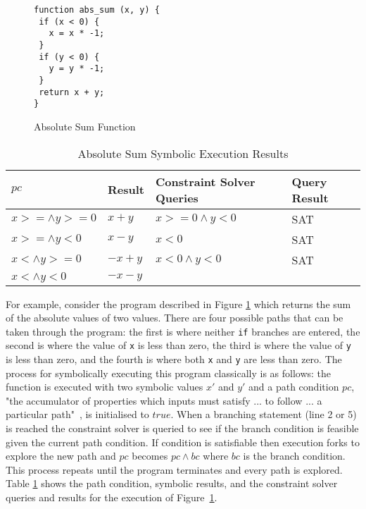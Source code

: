 \documentclass[]{final_report}
\begin{document}
\begin{figure}[t]
\begin{lstlisting}
function abs_sum (x, y) {
 if (x < 0) {
   x = x * -1;
 }
 if (y < 0) {
   y = y * -1;
 }
 return x + y;
}
\end{lstlisting}
\caption{\label{fig:abs-sum} Absolute Sum Function}
\end{figure} 

\begin{table}[t]
\centering
\begin{tabular}{|l|l|l|l|}
\hline
$pc$                & Result  & Constraint Solver Queries & Query Result \\ \hline
$x >= \land y >= 0$ & $x+y$   & $x >=0 \land y < 0 $      & SAT          \\ \hline
$x >= \land y < 0$  & $x - y$ & $x <0 $                   & SAT          \\ \hline
$x < \land y >= 0$  & $-x+y$  & $x<0 \land y < 0 $        & SAT          \\ \hline
$x < \land y < 0$   & $-x-y$  &                           &              \\ \hline
\end{tabular}
\caption{Absolute Sum Symbolic Execution Results}
\label{abs-sum-se-table}
\end{table}

For example, consider the program described in Figure \ref{fig:abs-sum} which returns the sum of the absolute values of two values. There are four possible paths that can be taken through the program: the first is where neither \lstinline|if| branches are entered, the second is where the value of \lstinline|x| is less than zero, the third is where the value of \lstinline|y| is less than zero, and the fourth is where both \lstinline|x| and \lstinline|y| are less than zero. The process for symbolically executing this program classically is as follows: the function is executed with two symbolic values $x'$ and $y'$ and a path condition $pc$, "the accumulator of properties which inputs must satisfy ... to follow ... a particular path"~\cite{king1976symbolic}, is initialised to $true$. When a branching statement (line 2 or 5) is reached the constraint solver is queried to see if the branch condition is feasible given the current path condition. If condition is satisfiable then execution forks to explore the new path and $pc$ becomes $pc \land bc$ where $bc$ is the branch condition. This process repeats until the program terminates and every path is explored. Table \ref{abs-sum-se-table} shows the path condition, symbolic results, and the constraint solver queries and results for the execution of Figure~\ref{fig:abs-sum}.
\end{document}
